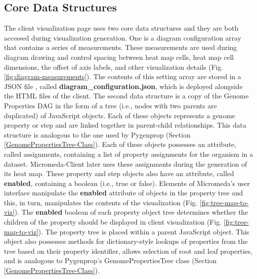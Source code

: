 \subsection{Core Data Structures} \label{visual-data-structures}

The client visualization page uses two core data structures and they are both accessed during visualization generation. One is a diagram configuration array that contains a series of measurements. These measurements are used during diagram drawing and control spacing between heat map cells, heat map cell dimensions, the offset of axis labels, and other visualization details (Fig. \ref{fig:diagram-measurements}). The contents of this setting array are stored in a JSON file \cite{bray2014rfc}, called \textbf{diagram\_configuration.json}, which is deployed alongside the HTML files of the client. The second data structure is a copy of the Genome Properties DAG in the form of a tree (i.e., nodes with two parents are duplicated) of JavaScript objects. Each of these objects represents a genome property or step and are linked together in parent-child relationships. This data structure is analogous to the one used by Pygenprop (Section \ref{GenomePropertiesTree-Class}). Each of these objects possesses an attribute, called assignments, containing a list of property assignments for the organism in a dataset. Micromeda-Client later uses these assignments during the generation of its heat map. These property and step objects also have an attribute, called \textbf{enabled}, containing a boolean (i.e., true or false). Elements of Micromeda's user interface manipulate the \textbf{enabled} attribute of objects in the property tree and this, in turn, manipulates the contents of the visualization (Fig. \ref{fig:tree-map-to-viz}). The \textbf{enabled} boolean of each property object tree determines whether the children of the property should be displayed in client visualization (Fig. \ref{fig:tree-map-to-viz}). The property tree is placed within a parent JavaScript object. This object also possesses methods for dictionary-style lookups of properties from the tree based on their property identifier, allows selection of root and leaf properties, and is analogous to Pygenprop's GenomePropertiesTree class (Section \ref{GenomePropertiesTree-Class}).

